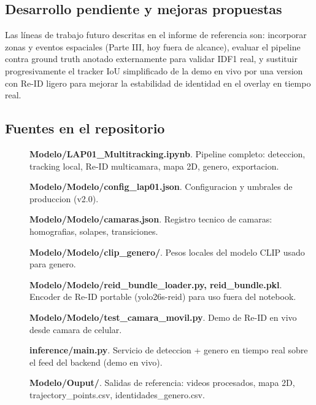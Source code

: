 \documentclass[12pt,letterpaper]{article}
\begin{document}
\subsection{Desarrollo pendiente y mejoras propuestas}

Las líneas de trabajo futuro descritas en el informe de referencia son: incorporar zonas y eventos espaciales (Parte III, hoy fuera de alcance), evaluar el pipeline contra ground truth anotado externamente para validar IDF1 real, y sustituir progresivamente el tracker IoU simplificado de la demo en vivo por una version con Re-ID ligero para mejorar la estabilidad de identidad en el overlay en tiempo real.


\subsection{Fuentes en el repositorio}

\begin{description}

\item[] \textbf{Modelo/LAP01\_Multitracking.ipynb}. Pipeline completo: deteccion, tracking local, Re-ID multicamara, mapa 2D, genero, exportacion.

\item[] \textbf{Modelo/Modelo/config\_lap01.json}. Configuracion y umbrales de produccion (v2.0).

\item[] \textbf{Modelo/Modelo/camaras.json}. Registro tecnico de camaras: homografias, solapes, transiciones.

\item[] \textbf{Modelo/Modelo/clip\_genero/}. Pesos locales del modelo CLIP usado para genero.

\item[] \textbf{Modelo/Modelo/reid\_bundle\_loader.py, reid\_bundle.pkl}. Encoder de Re-ID portable (yolo26s-reid) para uso fuera del notebook.

\item[] \textbf{Modelo/Modelo/test\_camara\_movil.py}. Demo de Re-ID en vivo desde camara de celular.

\item[] \textbf{inference/main.py}. Servicio de deteccion + genero en tiempo real sobre el feed del backend (demo en vivo).

\item[] \textbf{Modelo/Ouput/}. Salidas de referencia: videos procesados, mapa 2D, trajectory\_points.csv, identidades\_genero.csv.

\end{description}
\end{document}
